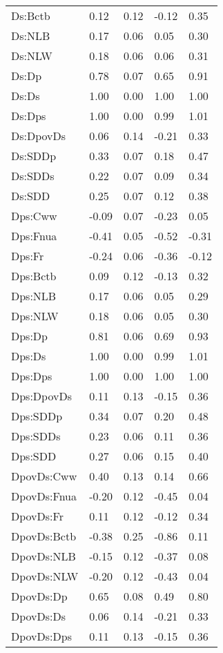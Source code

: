 \begin{center}
\begin{longtable}{|p{0.9in}|p{0.7in}|p{0.7in}|p{0.7in}|p{0.7in}|}
  Ds:Bctb & 0.12 & 0.12 & -0.12 & 0.35 \\ 
  Ds:NLB & 0.17 & 0.06 & 0.05 & 0.30 \\ 
  Ds:NLW & 0.18 & 0.06 & 0.06 & 0.31 \\ 
  Ds:Dp & 0.78 & 0.07 & 0.65 & 0.91 \\ 
  Ds:Ds & 1.00 & 0.00 & 1.00 & 1.00 \\ 
  Ds:Dps & 1.00 & 0.00 & 0.99 & 1.01 \\ 
  Ds:DpovDs & 0.06 & 0.14 & -0.21 & 0.33 \\ 
  Ds:SDDp & 0.33 & 0.07 & 0.18 & 0.47 \\ 
  Ds:SDDs & 0.22 & 0.07 & 0.09 & 0.34 \\ 
  Ds:SDD & 0.25 & 0.07 & 0.12 & 0.38 \\ 
  Dps:Cww & -0.09 & 0.07 & -0.23 & 0.05 \\ 
  Dps:Fnua & -0.41 & 0.05 & -0.52 & -0.31 \\ 
  Dps:Fr & -0.24 & 0.06 & -0.36 & -0.12 \\ 
  Dps:Bctb & 0.09 & 0.12 & -0.13 & 0.32 \\ 
  Dps:NLB & 0.17 & 0.06 & 0.05 & 0.29 \\ 
  Dps:NLW & 0.18 & 0.06 & 0.05 & 0.30 \\ 
  Dps:Dp & 0.81 & 0.06 & 0.69 & 0.93 \\ 
  Dps:Ds & 1.00 & 0.00 & 0.99 & 1.01 \\ 
  Dps:Dps & 1.00 & 0.00 & 1.00 & 1.00 \\ 
  Dps:DpovDs & 0.11 & 0.13 & -0.15 & 0.36 \\ 
  Dps:SDDp & 0.34 & 0.07 & 0.20 & 0.48 \\ 
  Dps:SDDs & 0.23 & 0.06 & 0.11 & 0.36 \\ 
  Dps:SDD & 0.27 & 0.06 & 0.15 & 0.40 \\ 
  DpovDs:Cww & 0.40 & 0.13 & 0.14 & 0.66 \\ 
  DpovDs:Fnua & -0.20 & 0.12 & -0.45 & 0.04 \\ 
  DpovDs:Fr & 0.11 & 0.12 & -0.12 & 0.34 \\ 
  DpovDs:Bctb & -0.38 & 0.25 & -0.86 & 0.11 \\ 
  DpovDs:NLB & -0.15 & 0.12 & -0.37 & 0.08 \\ 
  DpovDs:NLW & -0.20 & 0.12 & -0.43 & 0.04 \\ 
  DpovDs:Dp & 0.65 & 0.08 & 0.49 & 0.80 \\ 
  DpovDs:Ds & 0.06 & 0.14 & -0.21 & 0.33 \\ 
  DpovDs:Dps & 0.11 & 0.13 & -0.15 & 0.36 \\ 

\end{longtable}
\end{center}
